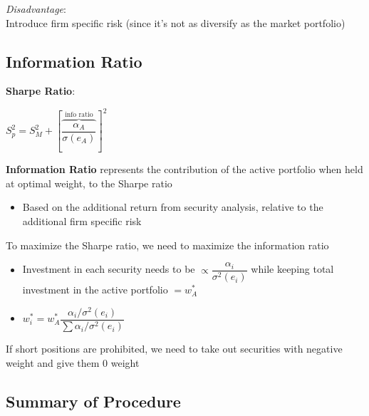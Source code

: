 \documentclass[]{book}
\providecommand{\tightlist}{%
  \setlength{\itemsep}{0pt}\setlength{\parskip}{0pt}}
\theoremstyle{definition}
\theoremstyle{definition}
\theoremstyle{remark}
\begin{document}
\emph{Disadvantage}:\\
Introduce firm specific risk (since it's not as diversify as the market
portfolio)

\subsection{Information Ratio}\label{information-ratio}

\textbf{Sharpe Ratio}:

\(S^2_p = S^2_M + \left[ \overbrace{\dfrac{\alpha_A}{\sigma(e_A)}}^{\text{info ratio}}\right]^2\)

\textbf{Information Ratio} represents the contribution of the active
portfolio when held at optimal weight, to the Sharpe ratio

\begin{itemize}
\tightlist
\item
  Based on the additional return from security analysis, relative to the
  additional firm specific risk
\end{itemize}

To maximize the Sharpe ratio, we need to maximize the information ratio

\begin{itemize}
\item
  Investment in each security needs to be
  \(\propto \dfrac{\alpha_i}{\sigma^2(e_i)}\) while keeping total
  investment in the active portfolio \(= w^*_A\)
\item
  \(w^*_i = w^*_A \dfrac{\alpha_i / \sigma^2(e_i)}{\sum \alpha_i / \sigma^2(e_i)}\)
\end{itemize}

If short positions are prohibited, we need to take out securities with
negative weight and give them 0 weight

\subsection{Summary of Procedure}\label{summary-of-procedure}
\end{document}
